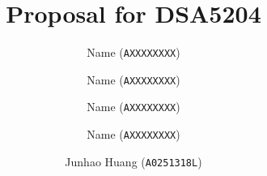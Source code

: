 \author{
  Name (\texttt{AXXXXXXXX})
  \and
  Name (\texttt{AXXXXXXXX})
  \and
  Name (\texttt{AXXXXXXXX})
  \and
  Name (\texttt{AXXXXXXXX})
  \and
  Junhao Huang (\texttt{A0251318L})
}

\title{Proposal for DSA5204}
\date{}
